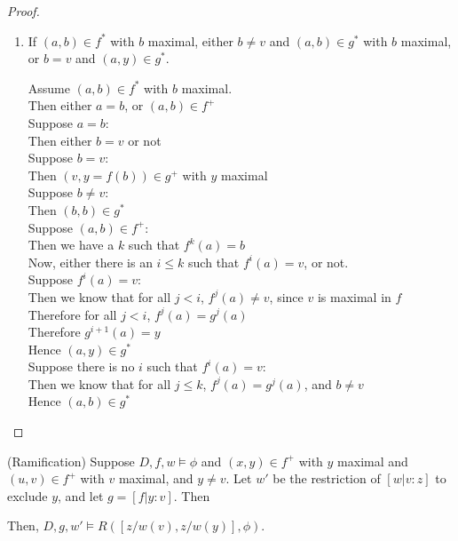 \begin{proof}
\begin{enumerate}
\item If $(a,b) \in f^*$ with $b$ maximal, either $b \not= v$ and $(a,b) \in g^*$ with $b$ maximal,
  or $b = v$ and $(a,y) \in g^*$. 
\begin{tabbedproof}
\oo Assume $(a,b) \in f^*$ with $b$ maximal. \\
\ooo Then either $a = b$, or $(a,b) \in f^+$ \\
\ooo Suppose $a = b$: \\
\oooo Then either $b = v$ or not \\
\oooo Suppose $b = v$: \\
\ooooo Then $(v, y = f(b)) \in g^+$ with $y$ maximal \\
\oooo Suppose $b \not= v$: \\
\ooooo Then $(b,b) \in g^*$ \\
\ooo Suppose $(a,b) \in f^+$: \\
\oooo Then we have a $k$ such that $f^k(a) = b$ \\
\oooo Now, either there is an $i \leq k$ such that $f^i(a) = v$, or not. \\
\oooo Suppose $f^i(a) = v$: \\
\ooooo Then we know that for all $j < i$, $f^j(a) \not= v$, since $v$ is maximal in $f$ \\
\ooooo Therefore for all $j < i$, $f^j(a) = g^j(a)$ \\
\ooooo Therefore $g^{i+1}(a) = y$ \\
\ooooo Hence $(a,y) \in g^*$ \\
\oooo Suppose there is no $i$ such that $f^i(a) = v$: \\
\ooooo Then we know that for all $j \leq k$, $f^j(a) = g^j(a)$, and $b \not= v$ \\
\ooooo Hence $(a,b) \in g^*$ \\
\end{tabbedproof}
\end{enumerate}
\end{proof}

\begin{lemma}{(Ramification)}
Suppose $D, f, w \models \phi$ and $(x,y) \in f^+$ with $y$ maximal and $(u, v) \in f^+$ with $v$ maximal,
and $y \not= v$. Let $w'$ be the restriction of $[w|v:z]$ to exclude $y$, and let $g = [f|y:v]$. Then

Then, $D, g,  w' \models R([z/w(v), z/w(y)], \phi)$.
\end{lemma}

